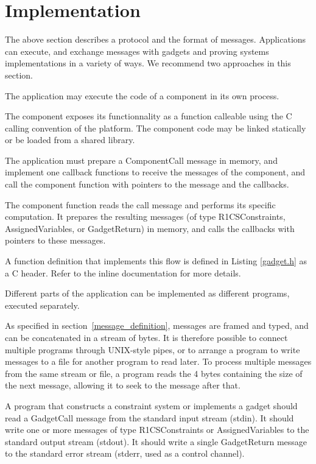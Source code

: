 \section{Implementation}
\label{sec:implementation}

The above section describes a protocol and the format of messages.
Applications can execute, and exchange messages with
gadgets and proving systems implementations in a variety of ways.
We recommend two approaches in this section.

\label{inmemory}

The application may execute the code of a component in its own process.

The component exposes its functionnality as a function calleable using the C calling convention of the platform. The component code may be linked statically or be loaded from a shared library.

The application must prepare a ComponentCall message in memory, and implement one callback functions to receive the messages of the component,
and call the component function with pointers to the message and the callbacks.

The component function reads the call message and performs its specific computation. It prepares the resulting messages (of type R1CSConstraints, AssignedVariables, or GadgetReturn) in memory, and calls the callbacks with pointers to these messages.

A function definition that implements this flow is defined in Listing \ref{gadget.h} as a C header. Refer to the inline documentation for more details.



Different parts of the application can be implemented as different
programs, executed separately.

As specified in section~\ref{message_definition}, messages are framed and typed,
and can be concatenated in a stream of bytes. It is therefore possible to connect multiple programs through UNIX-style pipes, or to arrange a program to write messages to a file for another program to read later.
To process multiple messages from the same stream or file, a program
reads the 4 bytes containing the size of the next message, allowing it to seek
to the message after that.

A program that constructs a constraint system or implements a gadget should read a GadgetCall message from the standard input stream (stdin).
It should write one or more messages of type R1CSConstraints or AssignedVariables to the standard output stream (stdout).
It should write a single GadgetReturn message to the standard error stream
(stderr, used as a control channel).


